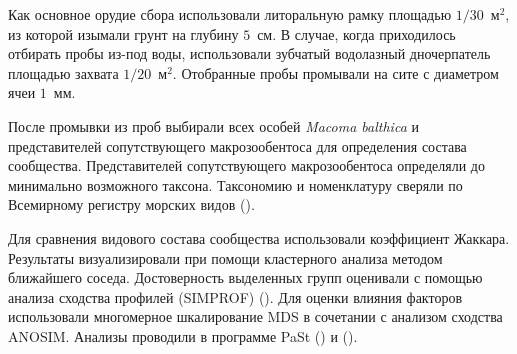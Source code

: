 Как основное орудие сбора использовали литоральную рамку площадью $1/30$~м$^2$, из которой изымали грунт на глубину $5$~см. 
В случае, когда приходилось отбирать пробы из-под воды, использовали зубчатый водолазный дночерпатель площадью захвата $1/20$~м$^2$.
Отобранные пробы промывали на сите с диаметром ячеи $1$~мм. 

После промывки из   проб   выбирали   всех   особей  {\it Macoma   balthica}  и   представителей   сопутствующего макрозообентоса    для   определения   состава   сообщества.
Представителей   сопутствующего макрозообентоса  определяли   до   минимально   возможного   таксона. Таксономию и номенклатуру сверяли по Всемирному регистру морских видов (\cite{WoRMS}).

Для сравнения видового состава сообщества использовали коэффициент Жаккара. 
Результаты визуализировали при помощи  кластерного анализа методом ближайшего соседа. 
Достоверность выделенных групп оценивали с помощью анализа сходства профилей (SIMPROF) (\cite{Clarke_et_al_2008}).
Для оценки влияния факторов использовали многомерное шкалирование MDS в сочетании с анализом сходства ANOSIM.
Анализы проводили в программе PaSt (\cite{Hammer_et_al_2001}) и \R{} (\cite{R_2014}).







